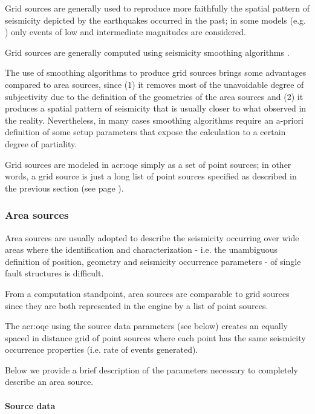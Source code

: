 Grid sources are generally used to reproduce more faithfully the spatial
pattern of seismicity depicted by the earthquakes occurred in the past; in
some models (e.g. \citet{petersen2008}) only events of low and intermediate
magnitudes are considered.

Grid sources are generally computed using seismicity smoothing algorithms
\citep[][amongst many others]{frankel1995,woo1996}.

The use of smoothing algorithms to produce grid sources brings some
advantages compared to area sources, since (1) it removes most of the
unavoidable degree of subjectivity due to the definition of the geometries of
the area sources and (2) it produces a spatial pattern of seismicity that is
usually closer to what observed in the reality. Nevertheless, in many cases
smoothing algorithms require an a-priori definition of some setup parameters
that expose the calculation to a certain degree of partiality.

Grid sources are modeled in \gls{acr:oqe} simply as a set of point sources; in
other words, a grid source is just a long list of point sources specified as
described in the previous section (see page
\pageref{subsubsec:point_sources}).



\subsubsection{Area sources}
\label{subsubsec:area_sources}

Area sources are usually adopted to describe the seismicity occurring over
wide areas where the identification and characterization - i.e. the
unambiguous definition of position, geometry and seismicity occurrence
parameters - of single fault structures is difficult.

From a computation standpoint, area sources are comparable to grid sources
since they are both represented in the engine by a list of point sources.

The \gls{acr:oqe} using the source data parameters (see below) creates an
equally spaced in distance grid of point sources where each point has the same
seismicity occurrence properties (i.e. rate of events generated).

Below we provide a brief description of the parameters necessary to completely
describe an area source.

\paragraph{Source data}


